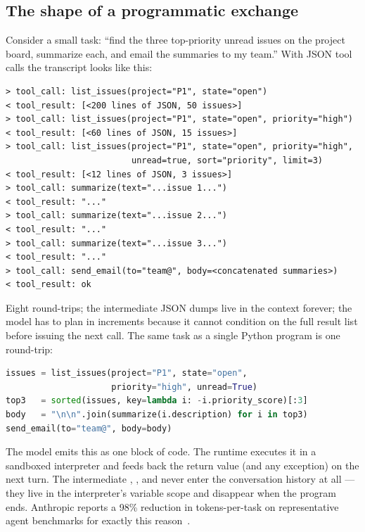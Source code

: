 \subsection{The shape of a programmatic exchange}
\label{sec:codeact-shape}

Consider a small task: ``find the three top-priority unread issues
on the project board, summarize each, and email the summaries to my
team.'' With JSON tool calls the transcript looks like this:

\begin{lstlisting}[caption={JSON-tool-call transcript: five round-trips, four intermediate states.},label=lst:json-shape]
> tool_call: list_issues(project="P1", state="open")
< tool_result: [<200 lines of JSON, 50 issues>]
> tool_call: list_issues(project="P1", state="open", priority="high")
< tool_result: [<60 lines of JSON, 15 issues>]
> tool_call: list_issues(project="P1", state="open", priority="high",
                         unread=true, sort="priority", limit=3)
< tool_result: [<12 lines of JSON, 3 issues>]
> tool_call: summarize(text="...issue 1...")
< tool_result: "..."
> tool_call: summarize(text="...issue 2...")
< tool_result: "..."
> tool_call: summarize(text="...issue 3...")
< tool_result: "..."
> tool_call: send_email(to="team@", body=<concatenated summaries>)
< tool_result: ok
\end{lstlisting}

\noindent
Eight round-trips; the intermediate JSON dumps live in the context
forever; the model has to plan in increments because it cannot
condition on the full result list before issuing the next call.
The same task as a single Python program is one round-trip:

\begin{lstlisting}[language=Python,caption={Programmatic equivalent: one round-trip, no intermediate JSON in context.},label=lst:py-shape]
issues = list_issues(project="P1", state="open",
                     priority="high", unread=True)
top3   = sorted(issues, key=lambda i: -i.priority_score)[:3]
body   = "\n\n".join(summarize(i.description) for i in top3)
send_email(to="team@", body=body)
\end{lstlisting}

\noindent
The model emits this as one block of code. The runtime executes it
in a sandboxed interpreter and feeds back the
 return value (and any exception) on the next
turn. The intermediate , , and 
never enter the conversation history at all --- they live in the
interpreter's variable scope and disappear when the program ends.
Anthropic reports a 98\% reduction in tokens-per-task on
representative agent benchmarks for exactly this
reason~\citep{anthropic2025mcpcode}.

